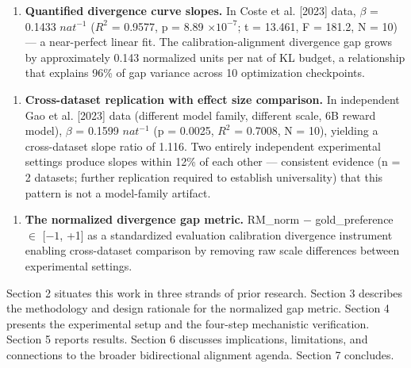 \begin{enumerate}
\item \textbf{Quantified divergence curve slopes.} In Coste et al. [2023] data, $\beta$ = 0.1433 $nat^{-1}$ ($R^2$ = 0.9577, p = 8.89 $\times 10^{-7}$; t = 13.461, F = 181.2, N = 10) --- a near-perfect linear fit. The calibration-alignment divergence gap grows by approximately 0.143 normalized units per nat of KL budget, a relationship that explains 96\% of gap variance across 10 optimization checkpoints.
\end{enumerate}

\begin{enumerate}
\item \textbf{Cross-dataset replication with effect size comparison.} In independent Gao et al. [2023] data (different model family, different scale, 6B reward model), $\beta$ = 0.1599 $nat^{-1}$ (p = 0.0025, $R^2$ = 0.7008, N = 10), yielding a cross-dataset slope ratio of 1.116. Two entirely independent experimental settings produce slopes within 12\% of each other --- consistent evidence (n = 2 datasets; further replication required to establish universality) that this pattern is not a model-family artifact.
\end{enumerate}

\begin{enumerate}
\item \textbf{The normalized divergence gap metric.} RM\_norm $-$ gold\_preference $\in$ [$-1$, +1] as a standardized evaluation calibration divergence instrument enabling cross-dataset comparison by removing raw scale differences between experimental settings.
\end{enumerate}

Section 2 situates this work in three strands of prior research. Section 3 describes the methodology and design rationale for the normalized gap metric. Section 4 presents the experimental setup and the four-step mechanistic verification. Section 5 reports results. Section 6 discusses implications, limitations, and connections to the broader bidirectional alignment agenda. Section 7 concludes.

